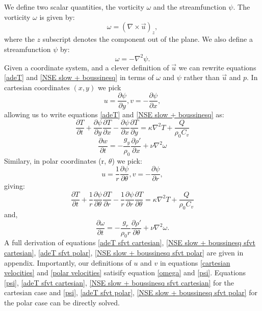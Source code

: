 \documentclass{article}
\begin{document}
We define two scalar quantities, the vorticity $\omega$ and the streamfunction $\psi$. The vorticity $\omega$ is given by:
\begin{equation}
	\omega = (\nabla \times \vec{u})_z,
	\label{omega}
\end{equation}
where the $z$ subscript denotes the component out of the plane. We also define a streamfunction $\psi$ by:
\begin{equation}
	\omega = - \nabla^2 \psi.
	\label{psi}
\end{equation}
Given a coordinate system, and a clever definition of $\vec{u}$ we can rewrite equations \ref{adeT} and \ref{NSE slow + boussinesq} in terms of $\omega$ and $\psi$ rather than $\vec{u}$ and $p$. In cartesian coordinates $(x,y)$ we pick 
\begin{equation}
	u = \frac{\partial \psi}{\partial y}, v = -\frac{\partial \psi}{\partial x},
	\label{cartesian velocities}
\end{equation}
allowing us to write equations \ref{adeT} and \ref{NSE slow + boussinesq} as:
\begin{equation}
	\frac{\partial T}{\partial t} + \frac{\partial \psi}{\partial y} \frac{\partial T}{\partial x} - \frac{\partial \psi}{\partial x} \frac{\partial T}{\partial y} = \kappa \nabla^2 T + \frac{Q}{\rho_0 C_v}
	\label{adeT sfvt cartesian}
\end{equation}
\begin{equation}
	\frac{\partial w}{\partial t} = -\frac{g_y}{\rho_0} \frac{\partial \rho'}{\partial x} + \nu \nabla^2 \omega
	\label{NSE slow + boussinesq sfvt cartesian}
\end{equation}
Similary, in polar coordinates (r, $\theta$) we pick:
\begin{equation}
	u = \frac{1}{r} \frac{\partial \psi}{\partial \theta}, v = -\frac{\partial \psi}{\partial r},
	\label{polar velocities}
\end{equation}
giving:
\begin{equation}
	\frac{\partial T}{\partial t} + \frac{1}{r} \frac{\partial \psi}{\partial \theta} \frac{\partial T}{\partial r} - \frac{1}{r} \frac{\partial \psi}{\partial r} \frac{\partial T}{\partial \theta} = \kappa \nabla^2 T + \frac{Q}{\rho_0 C_v}
	\label{adeT sfvt polar}
\end{equation}
and,
\begin{equation}
	\frac{\partial \omega}{\partial t} = - \frac{g_r}{\rho_0 r} \frac{\partial \rho'}{\partial \theta} +\nu \nabla^2 \omega.
	\label{NSE slow + boussinesq sfvt polar}
\end{equation}
A full derivation of equations \ref{adeT sfvt cartesian}, \ref{NSE slow + boussinesq sfvt cartesian}, \ref{adeT sfvt polar}, \ref{NSE slow + boussinesq sfvt polar} are given in appendix.
Importantly, our definitions of $u$ and $v$ in equations \ref{cartesian velocities} and \ref{polar velocities} satisify equation \ref{omega} and \ref{psi}. Equations \ref{psi}, \ref{adeT sfvt cartesian}, \ref{NSE slow + boussinesq sfvt cartesian} for the cartesian case and \ref{psi}, \ref{adeT sfvt polar}, \ref{NSE slow + boussinesq sfvt polar} for the polar case can be directly solved.
\end{document}
